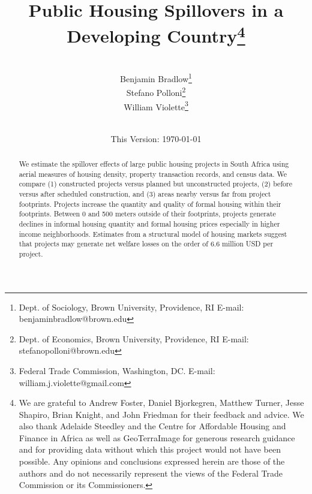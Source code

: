 \documentclass[12pt]{article}
\begin{document}
\begin{titlepage} 
\title{{Public Housing Spillovers in a Developing Country}\thanks{We are grateful to Andrew Foster, Daniel Bjorkegren, Matthew Turner, Jesse Shapiro, Brian Knight, and John Friedman for their feedback and advice.  We also thank Adelaide Steedley and the Centre for Affordable Housing and Finance in Africa as well as GeoTerraImage for generous research guidance and for providing data without which this project would not have been possible.  Any opinions and conclusions expressed herein are those of the authors and do not necessarily represent the views of the Federal Trade Commission or its Commissioners.}}
\author{\\[3em] Benjamin Bradlow\thanks{Dept. of Sociology, Brown University, Providence, RI  E-mail: benjamin\textunderscore bradlow@brown.edu}\\
 Stefano Polloni\thanks{Dept. of Economics, Brown University, Providence, RI E-mail: stefano\textunderscore polloni@brown.edu}\\ 
  William Violette\thanks{Federal Trade Commission, Washington, DC. E-mail: william.j.violette@gmail.com} \\
 \\ 
  }
\vspace{30mm}
\date{\vspace{5mm}This Version: \today}
\maketitle
\begin{abstract}




	We estimate the spillover effects of large public housing projects in South Africa using aerial measures of housing density, property transaction records, and census data.  We compare (1) constructed projects versus planned but unconstructed projects, (2) before versus after scheduled construction, and (3) areas nearby versus far from project footprints.  Projects increase the quantity and quality of formal housing within their footprints.  Between 0 and 500 meters outside of their footprints, projects generate declines in informal housing quantity and formal housing prices especially in higher income neighborhoods.  Estimates from a structural model of housing markets suggest that projects may generate net welfare losses on the order of 6.6 million USD per project.


\end{abstract}
\end{titlepage}
\end{document}
